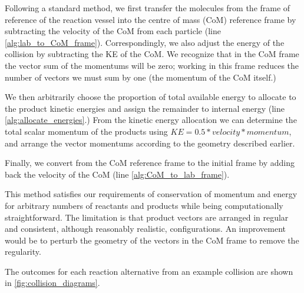 Following a standard method, we first transfer the molecules from the
frame of reference of the reaction vessel into the centre of mass (CoM)
reference frame by subtracting the velocity of the CoM from each
particle (line \cref{alg:lab_to_CoM_frame}). Correspondingly, we also
adjust the energy of the collision by subtracting the KE of the CoM. We
recognize that in the CoM frame the vector sum of the momentums will be
zero; working in this frame reduces the number of vectors we must sum by
one (the momentum of the CoM itself.)

We then arbitrarily choose the proportion of total available energy to allocate to the product kinetic energies and assign the remainder to internal energy (line \cref{alg:allocate_energies}.) From the kinetic energy allocation we can determine the total scalar momentum of the products using $KE = 0.5 * velocity * momentum$, and arrange the vector momentums according to the geometry described earlier.

Finally, we convert from the CoM reference frame to the initial frame by
adding back the velocity of the CoM (line \cref{alg:CoM_to_lab_frame}).

This method satisfies our requirements of conservation of momentum and
energy for arbitrary numbers of reactants and products while being
computationally straightforward. The limitation is that product vectors
are arranged in regular and consistent, although reasonably realistic,
configurations. An improvement would be to perturb the geometry of the
vectors in the CoM frame to remove the regularity.

The outcomes for each reaction alternative from an example collision are
shown in \cref{fig:collision_diagrams}.


